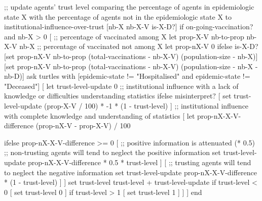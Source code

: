 \begin{algorithm}[language=NetLogo, caption={Institutional influence over trust}, label={algo:institutional}]
;; update agents' trust level comparing the percentage of agents in epidemiologic state X with the percentage of agents not in the epidemiologic state X
to institutional-influence-over-trust [nb-X nb-X-V is-X-D?]
  if on-going-vaccination? and nb-X > 0
  [
    ;; percentage of vaccinated among X
    let prop-X-V nb-to-prop nb-X-V nb-X
    ;; percentage of vaccinated not among X
    let prop-nX-V 0
    ifelse is-X-D?
      [set prop-nX-V nb-to-prop (total-vaccinations - nb-X-V) (population-size - nb-X)]
      [set prop-nX-V nb-to-prop (total-vaccinations - nb-X-V) (population-size - nb-X - nb-D)]
    ask turtles with [epidemic-state != "Hospitalised" and epidemic-state != "Deceased"] [
      let trust-level-update 0
      ;; institutional influence with a lack of knowledge or difficulties understanding statistics
      ifelse misinterpret? [
        set trust-level-update (prop-X-V / 100) * -1 * (1 - trust-level)
      ]
      ;; institutional influence with complete knowledge and understanding of statistics
      [
        let prop-nX-X-V-difference (prop-nX-V - prop-X-V) / 100

        ifelse prop-nX-X-V-difference >= 0 [
          ;; positive information is attenuated (* 0.5)
          ;; non-trusting agents will tend to neglect the positive information
          set trust-level-update prop-nX-X-V-difference * 0.5 * trust-level
        ]
        [
          ;; trusting agents will tend to neglect the negative information
          set trust-level-update prop-nX-X-V-difference * (1 - trust-level)
        ]
      ]
      set trust-level trust-level + trust-level-update
      if trust-level < 0 [ set trust-level 0 ]
      if trust-level > 1 [ set trust-level 1 ]
    ]
  ]
end
\end{algorithm}

\newpage

